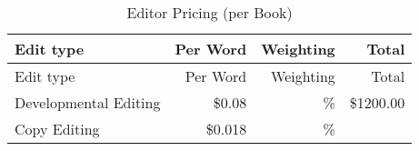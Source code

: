 \documentclass[10pt,openany]{book}
\begin{document}
\begin{longtable}[]{@{}lrrr@{}}
\caption{Editor Pricing (per Book)}\tabularnewline
\toprule
\begin{minipage}[b]{0.34\columnwidth}\raggedright
Edit type\strut
\end{minipage} & \begin{minipage}[b]{0.16\columnwidth}\raggedleft
Per Word\strut
\end{minipage} & \begin{minipage}[b]{0.16\columnwidth}\raggedleft
Weighting\strut
\end{minipage} & \begin{minipage}[b]{0.22\columnwidth}\raggedleft
Total\strut
\end{minipage}\tabularnewline
\midrule
\endfirsthead
\toprule
\begin{minipage}[b]{0.34\columnwidth}\raggedright
Edit type\strut
\end{minipage} & \begin{minipage}[b]{0.16\columnwidth}\raggedleft
Per Word\strut
\end{minipage} & \begin{minipage}[b]{0.16\columnwidth}\raggedleft
Weighting\strut
\end{minipage} & \begin{minipage}[b]{0.22\columnwidth}\raggedleft
Total\strut
\end{minipage}\tabularnewline
\midrule
\endhead
\begin{minipage}[t]{0.34\columnwidth}\raggedright
Developmental Editing\strut
\end{minipage} & \begin{minipage}[t]{0.16\columnwidth}\raggedleft
\$0.08\strut
\end{minipage} & \begin{minipage}[t]{0.16\columnwidth}\raggedleft
30\%\strut
\end{minipage} & \begin{minipage}[t]{0.22\columnwidth}\raggedleft
\$1200.00\strut
\end{minipage}\tabularnewline
\begin{minipage}[t]{0.34\columnwidth}\raggedright
Copy Editing\strut
\end{minipage} & \begin{minipage}[t]{0.16\columnwidth}\raggedleft
\$0.018\strut
\end{minipage} & \begin{minipage}[t]{0.16\columnwidth}\raggedleft
50\%\strut
\end{minipage} & \begin{minipage}[t]{0.22\columnwidth}\raggedleft

\end{minipage}
\end{longtable}
\end{document}
